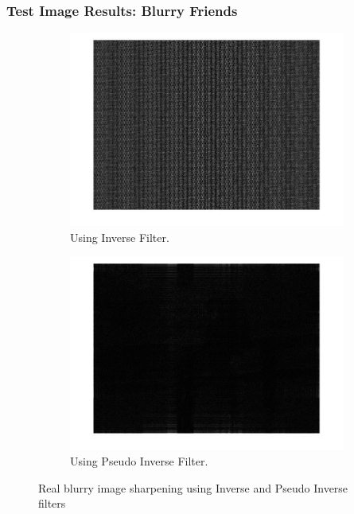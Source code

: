 \graphicspath{{mehul_pics/}}%

\subsubsection{Test Image Results: Blurry Friends}

\begin{figure}[H]
        \centering
        \begin{subfigure}[b]{0.49\textwidth}
                \centering
                \includegraphics[width=\textwidth]{inverse.jpg}
                \caption{Using Inverse Filter.}
        \end{subfigure}
        \begin{subfigure}[b]{0.49\textwidth}
                 \centering
                 \includegraphics[width=\textwidth]{pseudo_inverse.jpg}
                 \caption{Using Pseudo Inverse Filter.}
                 \label{fig:friends}
                       
        \end{subfigure}             
        \caption{Real blurry image sharpening using Inverse and Pseudo Inverse filters} 
\end{figure}

